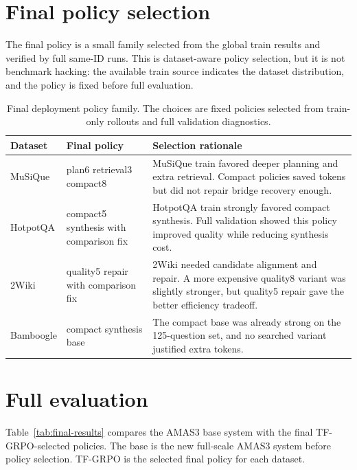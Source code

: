 \documentclass[10pt]{article}
\begin{document}
\section{Final policy selection}

The final policy is a small family selected from the global train results and verified by full same-ID runs. This is dataset-aware policy selection, but it is not benchmark hacking: the available train source indicates the dataset distribution, and the policy is fixed before full evaluation.

\begin{table}[H]
\centering
\small
\begin{tabular}{llp{7.4cm}}
\toprule
Dataset & Final policy & Selection rationale \\
\midrule
MuSiQue & plan6 retrieval3 compact8 & MuSiQue train favored deeper planning and extra retrieval. Compact policies saved tokens but did not repair bridge recovery enough. \\
HotpotQA & compact5 synthesis with comparison fix & HotpotQA train strongly favored compact synthesis. Full validation showed this policy improved quality while reducing synthesis cost. \\
2Wiki & quality5 repair with comparison fix & 2Wiki needed candidate alignment and repair. A more expensive quality8 variant was slightly stronger, but quality5 repair gave the better efficiency tradeoff. \\
Bamboogle & compact synthesis base & The compact base was already strong on the 125-question set, and no searched variant justified extra tokens. \\
\bottomrule
\end{tabular}
\caption{Final deployment policy family. The choices are fixed policies selected from train-only rollouts and full validation diagnostics.}
\label{tab:final-policy}
\end{table}

\section{Full evaluation}

Table~\ref{tab:final-results} compares the AMAS3 base system with the final TF-GRPO-selected policies. The base is the new full-scale AMAS3 system before policy selection. TF-GRPO is the selected final policy for each dataset.
\end{document}
